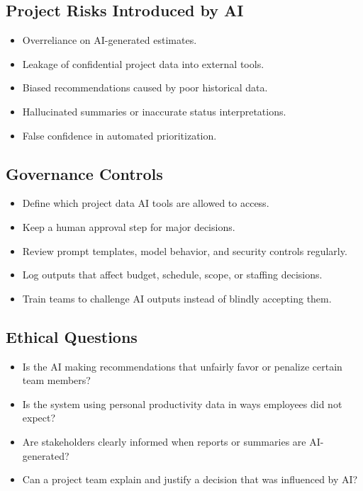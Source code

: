 \documentclass[11pt,a4paper]{article}
\begin{document}
\subsection{Project Risks Introduced by AI}

\begin{itemize}[leftmargin=*]
  \item Overreliance on AI-generated estimates.
  \item Leakage of confidential project data into external tools.
  \item Biased recommendations caused by poor historical data.
  \item Hallucinated summaries or inaccurate status interpretations.
  \item False confidence in automated prioritization.
\end{itemize}

\subsection{Governance Controls}

\begin{itemize}[leftmargin=*]
  \item Define which project data AI tools are allowed to access.
  \item Keep a human approval step for major decisions.
  \item Review prompt templates, model behavior, and security controls regularly.
  \item Log outputs that affect budget, schedule, scope, or staffing decisions.
  \item Train teams to challenge AI outputs instead of blindly accepting them.
\end{itemize}

\subsection{Ethical Questions}

\begin{itemize}[leftmargin=*]
  \item Is the AI making recommendations that unfairly favor or penalize certain team members?
  \item Is the system using personal productivity data in ways employees did not expect?
  \item Are stakeholders clearly informed when reports or summaries are AI-generated?
  \item Can a project team explain and justify a decision that was influenced by AI?
\end{itemize}
\end{document}
